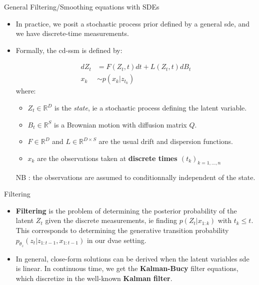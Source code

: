 \begin{frame}{General Filtering/Smoothing equations with SDEs}
    \begin{itemize}
        \item In practice, we posit a stochastic process prior defined by a general \gls{sde}, and we have discrete-time measurements.
        \item Formally, the \gls{cd-ssm} is defined by:
            \begin{tcolorbox}[colback=blue!5!white,colframe=black!75!black,title=Continuous-Discrete State Space model]
                \begin{align}
                    dZ_t &= F(Z_t, t)dt + L(Z_t,t) dB_t \\
                    x_k &\sim p(x_k \vert z_{t_k})
                \end{align}
                where:
                \begin{itemize}
                    \item $Z_t \in \mathbb{R}^{D}$ is the \textit{state}, ie a stochastic process defining the latent variable.
                    \item $B_t \in \mathbb{R}^{S}$ is a Brownian motion with diffusion matrix $Q$.
                    \item $F \in \mathbb{R}^{D}$ and $L \in \mathbb{R}^{D \times S}$ are the usual drift and dispersion functions.
                    \item $x_k$ are the observations taken at \textbf{discrete times $(t_k)_{k=1,...,n}$}
                \end{itemize}
                NB : the observations are assumed to conditionnally independent of the state.
            \end{tcolorbox}
    \end{itemize}
\end{frame}

\begin{frame}{Filtering}
    \begin{itemize}
        \item \textbf{Filtering} is the problem of determining the posterior probability of the latent $Z_t$ given the 
discrete measurements, ie finding $p(Z_t \vert x_{1:k})$ with $t_k \leq t$. This corresponds to 
determining the generative transition probability $p_{\theta_z}(z_t \vert z_{1:t-1}, x_{1:t-1})$ in our 
\gls{dvae} setting.
        \item In general, close-form solutions can be derived when the latent variables \gls{sde} is linear. In continuous 
time, we get the \textbf{Kalman-Bucy} filter equations, which discretize in the well-known \textbf{Kalman filter}.
    \end{itemize}
\end{frame}

